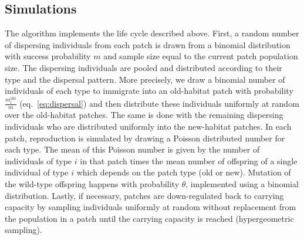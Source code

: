 \documentclass[a4paper,11pt]{article}
\newcommand{\chg}[1]{\textcolor{change}{#1}}
\begin{document}
\subsection*{Simulations}
The algorithm implements the life cycle described above. First, a random number of dispersing individuals \chg{from each patch} is drawn from a binomial distribution with success probability $m$ and sample size equal to the \chg{current patch} population size. The dispersing individuals \chg{are pooled and} distributed according to their type and the dispersal pattern. \chg{More precisely, we draw a binomial number of individuals of each type to immigrate into an old-habitat patch with probability $\frac{m_i^{\text{old}}}{m}$ (eq.~\eqref{eq:dispersal}) and then distribute these individuals uniformly at random over the old-habitat patches. The same is done with the remaining dispersing individuals who are distributed uniformly into the new-habitat patches.} \chg{In each patch, reproduction is simulated by drawing a Poisson distributed number for each type. The mean of this Poisson number is given by the number of individuals of type $i$ in that patch times the mean number of offspring of a single individual of type $i$ which depends on the patch type (old or new).} 
Mutation of the wild-type \chg{offspring} \chg{happens} with \chg{probability} $\theta$, implemented using a binomial distribution. Lastly, if necessary, \chg{patches are down-regulated back to carrying capacity by sampling individuals uniformly at random without replacement from the population in a patch until the carrying capacity is reached (hypergeometric sampling).} 
\end{document}
